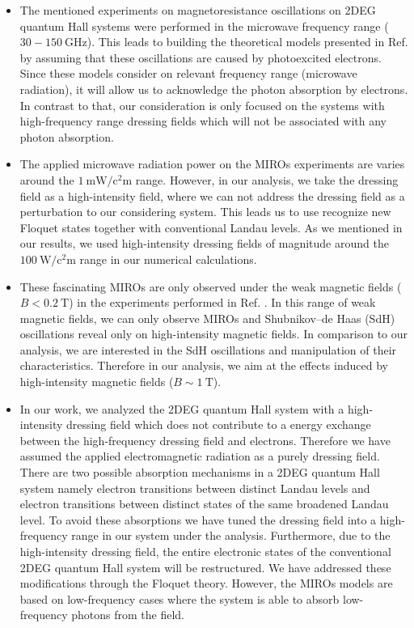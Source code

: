 \documentclass{article}
\begin{document}
\begin{itemize}
  \item
  The mentioned experiments on magnetoresistance oscillations on 2DEG quantum Hall systems \cite{zudov01,mani02,zudov03,mani04} were performed in the microwave frequency range ($30 -\SI{150}{\giga\hertz}$). This leads to building the theoretical models presented in Ref. \cite{durst03,dmitriev03} by assuming that these oscillations are caused by photoexcited electrons. Since these models consider on relevant frequency range (microwave radiation), it will allow us to acknowledge the photon absorption by electrons. In contrast to that, our consideration is only focused on the systems with high-frequency range dressing fields which will not be associated with any photon absorption.
  \item
  The applied microwave radiation power on the MIROs experiments \cite{mani02,zudov03} are varies around the  $\SI{1}{\milli\watt\per\square\centi\metre}$ range. However, in our analysis, we take the dressing field as a high-intensity field, where we can not address the dressing field as a perturbation to our considering system. This leads us to use recognize new Floquet states together with conventional Landau levels. As we mentioned in our results, we used high-intensity dressing fields of magnitude around the $\SI{100}{\watt\per\square\centi\metre}$ range in our numerical calculations.
  \item
  These fascinating MIROs are only observed under the weak magnetic fields ($B < \SI{0.2}{\tesla}$) in the experiments performed in Ref. \cite{zudov01,mani02,zudov03,mani04}. In this range of weak magnetic fields,  we can only observe MIROs and Shubnikov–de Haas (SdH) oscillations reveal only on high-intensity magnetic fields. In comparison to our analysis, we are  interested in the SdH oscillations and manipulation of their characteristics. Therefore in our analysis, we aim at the effects induced by high-intensity magnetic fields ($B \sim \SI{1}{\tesla}$).
  \item
  In our work, we analyzed the 2DEG quantum Hall system with a high-intensity dressing field which does not contribute to a energy exchange between the high-frequency dressing field and electrons. Therefore we have assumed the applied electromagnetic radiation as a purely dressing field. There are two possible absorption mechanisms in a 2DEG quantum Hall system namely electron transitions between distinct Landau levels and electron transitions between distinct states of the same broadened Landau level. To avoid these absorptions we have tuned the dressing field into a high-frequency range in our system under the analysis. Furthermore, due to the high-intensity dressing field, the entire electronic states of the conventional 2DEG quantum Hall system will be restructured. We have addressed these modifications through the Floquet theory. However, the MIROs models \cite{durst03,dmitriev03} are based on low-frequency cases where the system is able to absorb low-frequency photons from the field.
\end{itemize}
\end{document}
